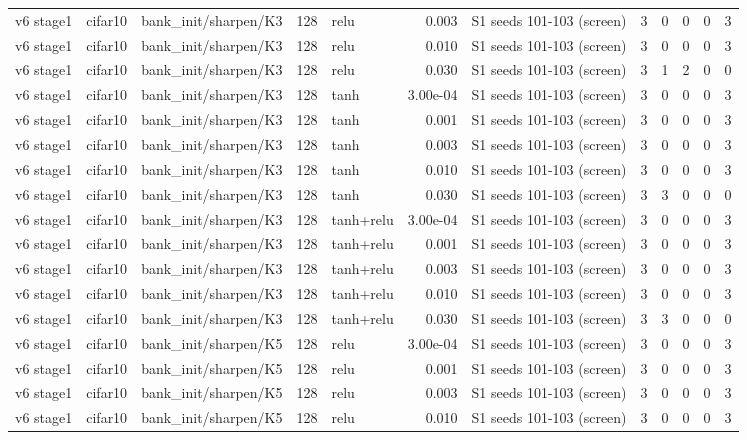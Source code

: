 \begin{table}[htbp]
{\begin{tabular}{@{}lllrlrlrrrrr@{}}
v6 stage1 & cifar10 & bank\_init/sharpen/K3 & 128 & relu & 0.003 & S1 seeds 101-103 (screen) & 3 & 0 & 0 & 0 & 3 \\
v6 stage1 & cifar10 & bank\_init/sharpen/K3 & 128 & relu & 0.010 & S1 seeds 101-103 (screen) & 3 & 0 & 0 & 0 & 3 \\
v6 stage1 & cifar10 & bank\_init/sharpen/K3 & 128 & relu & 0.030 & S1 seeds 101-103 (screen) & 3 & 1 & 2 & 0 & 0 \\
v6 stage1 & cifar10 & bank\_init/sharpen/K3 & 128 & tanh & 3.00e-04 & S1 seeds 101-103 (screen) & 3 & 0 & 0 & 0 & 3 \\
v6 stage1 & cifar10 & bank\_init/sharpen/K3 & 128 & tanh & 0.001 & S1 seeds 101-103 (screen) & 3 & 0 & 0 & 0 & 3 \\
v6 stage1 & cifar10 & bank\_init/sharpen/K3 & 128 & tanh & 0.003 & S1 seeds 101-103 (screen) & 3 & 0 & 0 & 0 & 3 \\
v6 stage1 & cifar10 & bank\_init/sharpen/K3 & 128 & tanh & 0.010 & S1 seeds 101-103 (screen) & 3 & 0 & 0 & 0 & 3 \\
v6 stage1 & cifar10 & bank\_init/sharpen/K3 & 128 & tanh & 0.030 & S1 seeds 101-103 (screen) & 3 & 3 & 0 & 0 & 0 \\
v6 stage1 & cifar10 & bank\_init/sharpen/K3 & 128 & tanh+relu & 3.00e-04 & S1 seeds 101-103 (screen) & 3 & 0 & 0 & 0 & 3 \\
v6 stage1 & cifar10 & bank\_init/sharpen/K3 & 128 & tanh+relu & 0.001 & S1 seeds 101-103 (screen) & 3 & 0 & 0 & 0 & 3 \\
v6 stage1 & cifar10 & bank\_init/sharpen/K3 & 128 & tanh+relu & 0.003 & S1 seeds 101-103 (screen) & 3 & 0 & 0 & 0 & 3 \\
v6 stage1 & cifar10 & bank\_init/sharpen/K3 & 128 & tanh+relu & 0.010 & S1 seeds 101-103 (screen) & 3 & 0 & 0 & 0 & 3 \\
v6 stage1 & cifar10 & bank\_init/sharpen/K3 & 128 & tanh+relu & 0.030 & S1 seeds 101-103 (screen) & 3 & 3 & 0 & 0 & 0 \\
v6 stage1 & cifar10 & bank\_init/sharpen/K5 & 128 & relu & 3.00e-04 & S1 seeds 101-103 (screen) & 3 & 0 & 0 & 0 & 3 \\
v6 stage1 & cifar10 & bank\_init/sharpen/K5 & 128 & relu & 0.001 & S1 seeds 101-103 (screen) & 3 & 0 & 0 & 0 & 3 \\
v6 stage1 & cifar10 & bank\_init/sharpen/K5 & 128 & relu & 0.003 & S1 seeds 101-103 (screen) & 3 & 0 & 0 & 0 & 3 \\
v6 stage1 & cifar10 & bank\_init/sharpen/K5 & 128 & relu & 0.010 & S1 seeds 101-103 (screen) & 3 & 0 & 0 & 0 & 3 \\

\end{tabular}}
\end{table}
